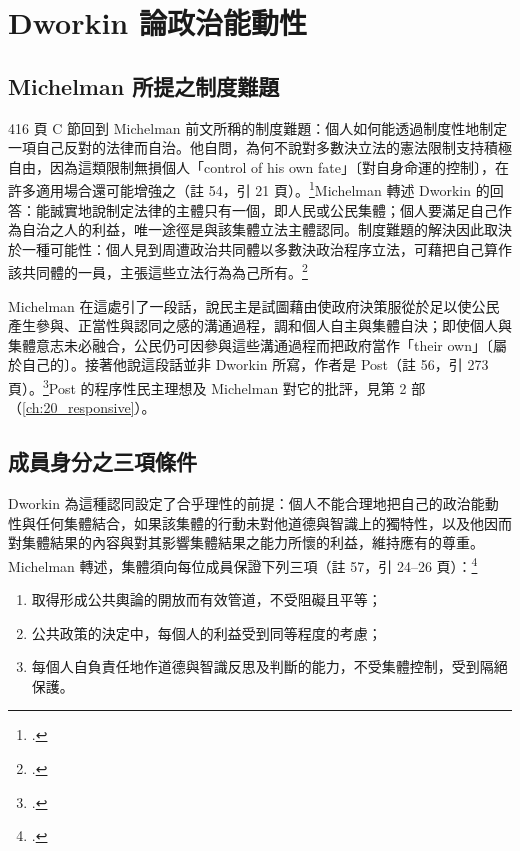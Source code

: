 \section{Dworkin 論政治能動性}
\label{sec:30_dworkin-6}

\subsection{Michelman 所提之制度難題}

416 頁 C 節回到 Michelman 前文所稱的制度難題：個人如何能透過制度性地制定一項自己反對的法律而自治。他自問，為何不說對多數決立法的憲法限制支持積極自由，因為這類限制無損個人「control of his own fate」〔對自身命運的控制〕，在許多適用場合還可能增強之（註 54，引  21 頁）。\footcite[416 \& n.54]{michelman1998}Michelman 轉述 Dworkin 的回答：能誠實地說制定法律的主體只有一個，即人民或公民集體；個人要滿足自己作為自治之人的利益，唯一途徑是與該集體立法主體認同。制度難題的解決因此取決於一種可能性：個人見到周遭政治共同體以多數決政治程序立法，可藉把自己算作該共同體的一員，主張這些立法行為為己所有。\footcite[416--417 \& n.55]{michelman1998}

Michelman 在這處引了一段話，說民主是試圖藉由使政府決策服從於足以使公民產生參與、正當性與認同之感的溝通過程，調和個人自主與集體自決；即使個人與集體意志未必融合，公民仍可因參與這些溝通過程而把政府當作「their own」〔屬於自己的〕。接著他說這段話並非 Dworkin 所寫，作者是 Post（註 56，引  273 頁）。\footcite[417 \& n.56]{michelman1998}Post 的程序性民主理想及 Michelman 對它的批評，見第 2 部（\ref{ch:20_responsive}）。

\subsection{成員身分之三項條件}

Dworkin 為這種認同設定了合乎理性的前提：個人不能合理地把自己的政治能動性與任何集體結合，如果該集體的行動未對他道德與智識上的獨特性，以及他因而對集體結果的內容與對其影響集體結果之能力所懷的利益，維持應有的尊重。Michelman 轉述，集體須向每位成員保證下列三項（註 57，引  24--26 頁）：\footcite[417 \& n.57]{michelman1998}

\begin{enumerate}
\tightlist
\item 取得形成公共輿論的開放而有效管道，不受阻礙且平等；
\item 公共政策的決定中，每個人的利益受到同等程度的考慮；
\item 每個人自負責任地作道德與智識反思及判斷的能力，不受集體控制，受到隔絕保護。
\end{enumerate}

